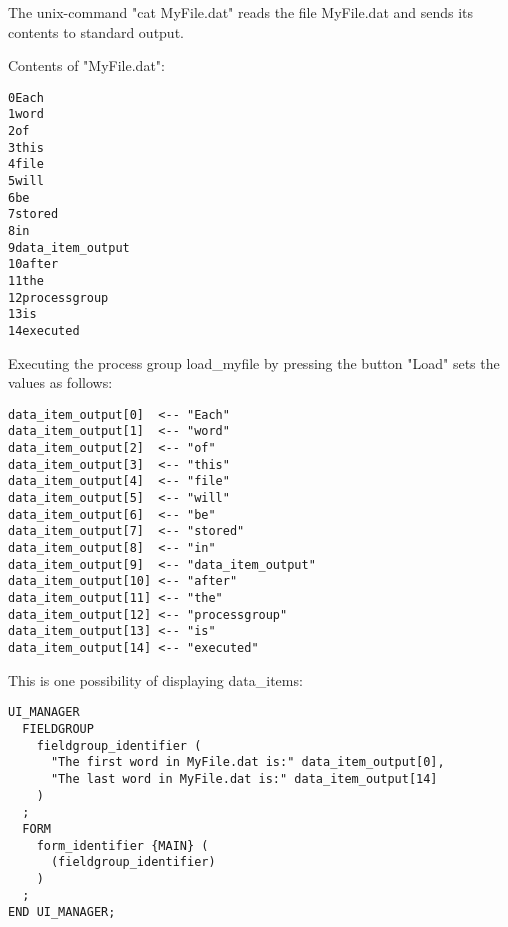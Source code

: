 \vspace{0.5cm}

The unix-command "cat MyFile.dat" reads the file MyFile.dat
and sends its contents to standard output.

Contents of "MyFile.dat":

\begin{boxedminipage}[t]{\linewidth}
\begin{alltt}
0 Each
1 word
2 of
3 this
4 file
5 will
6 be
7 stored
8 in
9 data_item_output
10 after
11 the
12 processgroup
13 is
14 executed
\end{alltt}
\end{boxedminipage}

\vspace{0.5cm}

Executing the process group load\_myfile by pressing the button
"Load" sets the values as follows:

\begin{boxedminipage}[t]{\linewidth}
\begin{verbatim}
data_item_output[0]  <-- "Each"
data_item_output[1]  <-- "word"
data_item_output[2]  <-- "of"
data_item_output[3]  <-- "this"
data_item_output[4]  <-- "file"
data_item_output[5]  <-- "will"
data_item_output[6]  <-- "be"
data_item_output[7]  <-- "stored"
data_item_output[8]  <-- "in"
data_item_output[9]  <-- "data_item_output"
data_item_output[10] <-- "after"
data_item_output[11] <-- "the"
data_item_output[12] <-- "processgroup"
data_item_output[13] <-- "is"
data_item_output[14] <-- "executed"
\end{verbatim}
\end{boxedminipage}

\vspace{0.5cm}

This is one possibility of displaying data\_items:

\begin{boxedminipage}[t]{\linewidth}
\begin{verbatim}
UI_MANAGER
  FIELDGROUP
    fieldgroup_identifier (
      "The first word in MyFile.dat is:" data_item_output[0],
      "The last word in MyFile.dat is:" data_item_output[14]
    )
  ;
  FORM
    form_identifier {MAIN} (
      (fieldgroup_identifier)
    )
  ;
END UI_MANAGER;
\end{verbatim}
\end{boxedminipage}
